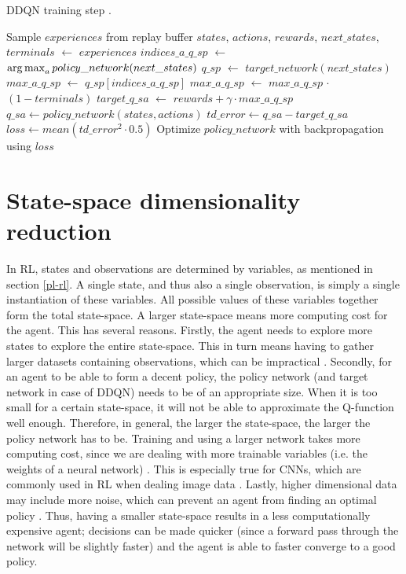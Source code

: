 \begin{algorithm}
\caption{DDQN training step \cite[p.299]{grokking}.}
\label{alg:ddqn}
\begin{algorithmic}
\State Sample $experiences$ from replay buffer
\State $states$, $actions$, $rewards$, $next\_states$, $terminals$ $\gets$ $experiences$
\State $indices\_a\_q\_sp$ $\gets$ $\operatorname*{arg\,max}_a policy\_ network(next\_states)$
\State $q\_sp$ $\gets$ $target\_network(next\_states)$
\State $max\_a\_q\_sp$ $\gets$ $q\_sp[indices\_a\_q\_sp]$
\State $max\_a\_q\_sp$ $\gets$ $max\_a\_q\_sp$ $\cdot$ $(1-terminals)$ 
\State $target\_q\_sa$ $\gets$ $rewards + \gamma \cdot max\_a\_q\_sp$
\State $q\_sa \gets policy\_network(states, actions)$
\State $td\_error \gets q\_sa - target\_q\_sa$
\State $loss \gets mean(td\_error^2 \cdot 0.5)$
\State Optimize $policy\_network$ with backpropagation using $loss$
\end{algorithmic}
\end{algorithm}

\section{State-space dimensionality reduction}\label{pl-dimensionality}
In RL, states and observations are determined by variables, as mentioned in section \ref{pl-rl}. A single state, and thus also a single observation, is simply a single instantiation of these variables. All possible values of these variables together form the total state-space. A larger state-space means more computing cost for the agent. This has several reasons. Firstly, the agent needs to explore more states to explore the entire state-space. This in turn means having to gather larger datasets containing observations, which can be impractical \cite{AE-2019}. Secondly, for an agent to be able to form a decent policy, the policy network (and target network in case of DDQN) needs to be of an appropriate size. When it is too small for a certain state-space, it will not be able to approximate the Q-function well enough. Therefore, in general, the larger the state-space, the larger the policy network has to be. Training and using a larger network takes more computing cost, since we are dealing with more trainable variables (i.e. the weights of a neural network) \cite{AE_2019}. This is especially true for CNNs, which are commonly used in RL when dealing image data \cite{CNN_computation}. Lastly, higher dimensional data may include more noise, which can prevent an agent from finding an optimal policy \cite{AE_2016}. Thus, having a smaller state-space results in a less computationally expensive agent; decisions can be made quicker (since a forward pass through the network will be slightly faster) and the agent is able to faster converge to a good policy. 

